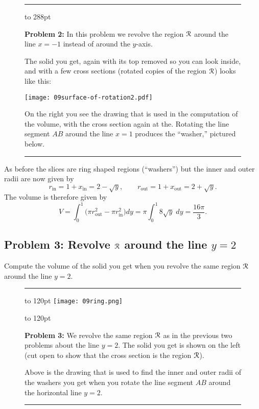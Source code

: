 \begin{figure}[hbt]
  \centering \rule[8pt]{\textwidth}{1pt}
  \begin{minipage}[b]{130pt}
    \vbox to 288pt{\footnotesize\sffamily%
      \centerline{  }

      \smallskip

      \textbf{Problem 2: } In this problem we revolve the region $\mathcal{R}$ around
      the line $x=-1$ instead of around the $y$-axis.

      The solid you get, again with its top removed so you can look inside, and
      with a few cross sections (rotated copies of the region $\mathcal{R}$) looks
      like this: \vfill

    \texttt{[image: 09surface-of-rotation2.pdf]}
    \vfill

    On the right you see the drawing that is used in the computation of the
    volume, with the cross section again at the.  Rotating the line segment $AB$
    around the line $x=1$ produces the ``washer,'' pictured below.  }
\end{minipage}%
\begin{minipage}[b]{220pt}
  \sffamily\centering 
\end{minipage}
\rule{\textwidth}{1pt}

\end{figure}
As before the slices are ring shaped regions (``washers'') but the inner and
outer radii are now given by
\[
r_{\textrm{in}} = 1+x_{\textrm{in}} = 2-\sqrt y,\qquad r_{\textrm{out}} =
1+x_{\textrm{out}} = 2+\sqrt y.
\]
The volume is therefore given by
\[
V=\int_0^1 \bigl(\pi r_{\textrm{out}}^2-\pi r_{\textrm{in}}^2\bigr)dy
=\pi\int_0^1 8\sqrt y\; dy =\frac{16\pi}3.
\]


\subsection{Problem 3: Revolve $\mathcal{R}$ around the line $y=2$} %
Compute the volume of the solid you get when you revolve the same region $\mathcal{R}$
around the line $y=2$.

\begin{figure}[h]
  \rule{\textwidth}{1pt} \sffamily\centering
  

      \parbox{144pt}{ \vbox to 120pt{
          \texttt{[image: 09ring.png]}} } \qquad
      \parbox{130pt}{\vbox to 120pt{\footnotesize\sffamily%
      \textbf{Problem 3:} We revolve the same region $\mathcal{R}$ as in the previous
      two problems about the line $y=2$.  The solid you get is shown on the left
      (cut open to show that the cross section is the region $\mathcal{R}$).
      
      Above is the drawing that is used to find the inner and outer radii of 
      the washers you get when you rotate the line segment $AB$ around the
      horizontal line $y=2$.}}  \rule{\textwidth}{1pt}
      
\end{figure}

